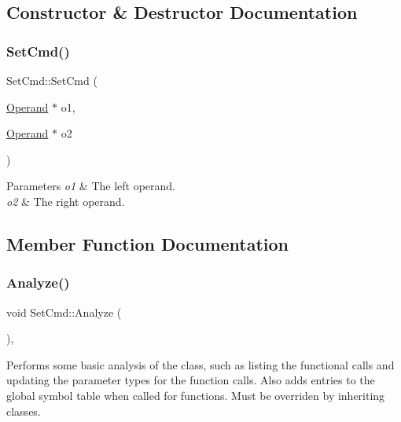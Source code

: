 \subsection{Constructor \& Destructor Documentation}
\mbox{\label{class_set_cmd_ac83b6dcab00a2c796e088ac4c7013cd7}} 
\subsubsection{\texorpdfstring{Set\+Cmd()}{SetCmd()}}
{\footnotesize\ttfamily Set\+Cmd\+::\+Set\+Cmd (\begin{DoxyParamCaption}\item[{\hyperlink{class_operand}{Operand} $\ast$}]{o1,  }\item[{\hyperlink{class_operand}{Operand} $\ast$}]{o2 }\end{DoxyParamCaption})}


\begin{DoxyParams}{Parameters}
{\em o1} & The left operand. \\
\hline
{\em o2} & The right operand. \\
\hline
\end{DoxyParams}


\subsection{Member Function Documentation}
\mbox{\label{class_set_cmd_ad3d2a13f9dd92cddd09c3c280e601583}} 
\subsubsection{\texorpdfstring{Analyze()}{Analyze()}}
{\footnotesize\ttfamily void Set\+Cmd\+::\+Analyze (\begin{DoxyParamCaption}{ }\end{DoxyParamCaption})\hspace{0.3cm}{\ttfamily [inline]}, {\ttfamily [virtual]}}

Performs some basic analysis of the class, such as listing the functional calls and updating the parameter types for the function calls. Also adds entries to the global symbol table when called for functions. Must be overriden by inheriting classes. 

